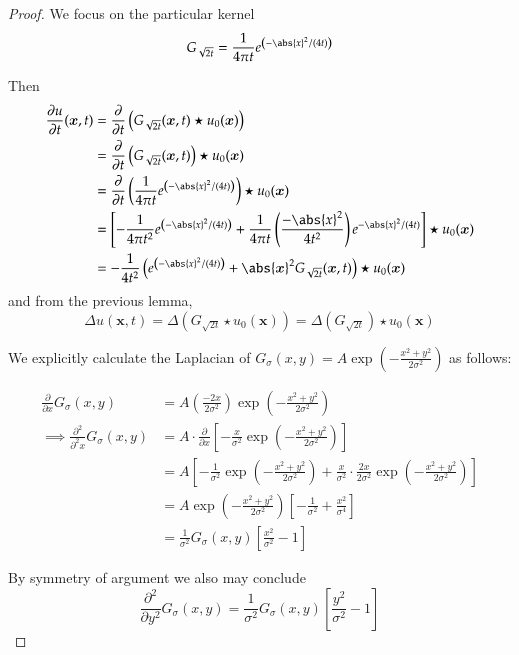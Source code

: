 	\begin{proof}
		We focus on the particular kernel
		\[
			G_{\sqrt{2t}} = \frac{1}{4\pi t} e^{\left(-\abs{x}^2 / (4t)\right)}
			\]
	
	
	Then
	\begin{align}
	\frac{\partial u}{\partial t} (\bm{x}, t)
		&= \frac{\partial}{\partial t} \left(G_{\sqrt{2t}}(\bm{x},t) \star u_0(\bm{x})\right)  \\
		&= \frac{\partial}{\partial t} \left(G_{\sqrt{2t}}(\bm{x},t)\right) \star u_0(\bm{x})  \\
		&= \frac{\partial}{\partial t} \left(
			\frac{1}{4\pi t} e^{\left(-\abs{x}^2 / (4t)\right)} \right) \star u_0(\bm{x}) \\
		&= \left[
		-\frac{1}{4\pi t^2} e^{\left(-\abs{x}^2 / (4t)\right)}
			+ \frac{1}{4\pi t}\left(\frac{-\abs{x}^2}{4t^2}\right) e^{-\abs{x}^2 / (4t)}
			\right] \star u_0(\bm{x}) \\
			&= -\frac{1}{4t^2} \left( e^{\left(-\abs{x}^2 / (4t)\right)} 
					+ \abs{\bm{x}}^2 G_{\sqrt{2t}}(\bm{x},t)
						\right) \star u_0(\bm{x})
	\end{align}
	and from the previous lemma,
	\[
	\Delta u(\bm{x}, t) = \Delta\left( G_{\sqrt{2t}} \star u_0(\bm{x})\right)
						= \Delta\left( G_{\sqrt{2t}} \right)\star u_0(\bm{x})
	\]
	
	We explicitly calculate the Laplacian of $G_{\sigma}(x,y) = A \exp(-\frac{x^2 + y^2}{2\sigma^2})$ as follows:
	
	\begin{align*}
	\frac{\partial}{\partial x} G_{\sigma}(x,y)
		&= A \left( \frac{-2x}{2\sigma^2}\right) \exp\left(-\frac{x^2 + y^2}{2\sigma^2}\right) \\
		\implies \frac{\partial^2}{\partial^2 x} G_{\sigma}(x,y)
		&= A \cdot \frac{\partial}{\partial x}
		\left[ - \frac{x}{\sigma^2} \exp\left(-\frac{x^2 + y^2}{2\sigma^2}\right) \right] \\
		&= A \left[ - \frac{1}{\sigma^2} \exp\left(-\frac{x^2 + y^2}{2\sigma^2}\right) 
			+ \frac{x}{\sigma^2} \cdot \frac{2x}{2\sigma^2} \exp\left(-\frac{x^2 + y^2}{2\sigma^2}\right) \right] \\
			&= A \exp\left(-\frac{x^2 + y^2}{2\sigma^2}\right)
				\left[ - \frac{1}{\sigma^2} + \frac{x^2}{\sigma^4} \right] \\
				&= \frac{1}{\sigma^2} G_\sigma(x,y)  \left[ \frac{x^2}{\sigma^2} - 1\right]
	\end{align*}
	
	By symmetry of argument we also may conclude
	\[
	\frac{\partial^2}{\partial y^2} G_{\sigma}(x,y) = \frac{1}{\sigma^2} G_\sigma(x,y)  \left[ \frac{y^2}{\sigma^2} - 1\right]
	\]
	

\end{proof}
